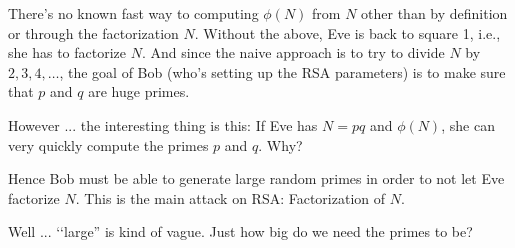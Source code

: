 There's no known fast way to computing $\phi(N)$ from $N$
other than by definition
or through the factorization $N$.
Without the above, Eve is back to square 1, i.e., 
she has to factorize $N$.
And since the naive approach is to try to divide $N$ by $2, 3, 4, \ldots$,
the goal of Bob (who's setting up the RSA parameters) is to make sure that $p$
and $q$ are huge primes.


 
However ... the interesting thing is this:
If Eve has $N = pq$ and $\phi(N)$,
she can very quickly compute the primes $p$ and $q$.
Why?



\begin{comment}
Note that for $N = pq$
\[
\phi(N) = (p-1)(q-1) = pq - (p+q) + 1
\]
You see the sum and product of $p$ and $q$.
The sum and product of two quantities appear in a
\textit{very} familiar 
context.
Hmmm ... where have we seen this before?
Look at this:
\[
(x - a)(x - b) = x^2 - (a+b)x + (ab)
\] 
The sum and product of roots of a quadratic equation appears in the 
coefficients
of the polynomial (if the leading coefficient is 1).
For our case we have
\[
(x-p)(x-q) = x^2 - (p+q)x + (pq)
\]
But $pq = N$ and 
from
\[
\phi(N) = pq - (p+q) + 1
\]
we have
\[
p+q = pq - \phi(N) + 1 = n - \phi(N) + 1
\]
Putting this into our polynomial we get
\begin{align*}
(x-p)(x-q) 
&= x^2 - (p+q)x + (pq) \\
&= x^2 - (N - \phi(N) + 1)x + N
\end{align*}
The point: the polynomial $(x-p)(x-q)$ has coefficients that depends only on 
$N$ and $\phi(N)$.

So what does this mean for Eve?
If she has $N$ and $\phi(N)$, she can write down the polynomial
\begin{align*}
x^2 - (N - \phi(N) + 1) + N
\end{align*}
She can also solve for the roots of this polynomial (using the quadratic 
equation formula)
and therefore obtain the primes of $N$.
\end{comment}


Hence Bob must be able to generate large random primes in order to not let Eve
factorize $N$.
This is the main attack on RSA: Factorization of $N$.

Well ... \lq\lq large'' is kind of vague.
Just how big do we need the primes to be?

